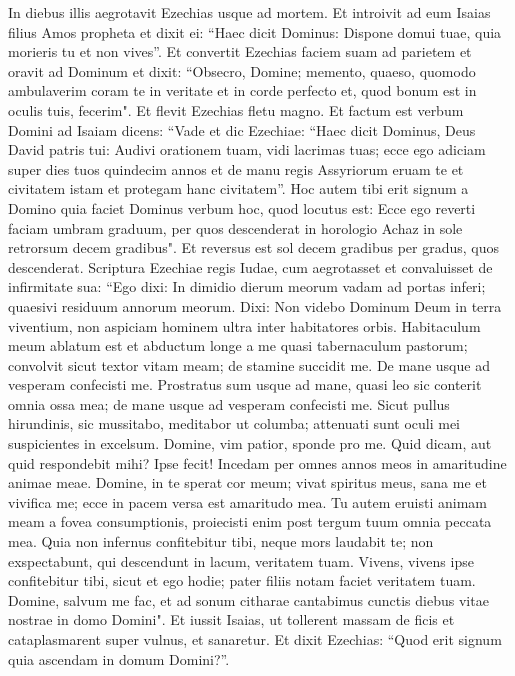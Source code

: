 \begin{biblechapter}  
\verse In diebus illis aegrotavit Ezechias usque ad mortem. Et introivit ad eum Isaias filius Amos propheta et dixit ei: “Haec dicit Dominus: Dispone domui tuae, quia morieris tu et non vives”. 
\verse Et convertit Ezechias faciem suam ad parietem et oravit ad Dominum 
\verse et dixit: “Obsecro, Domine; memento, quaeso, quomodo ambulaverim coram te in veritate et in corde perfecto et, quod bonum est in oculis tuis, fecerim". Et flevit Ezechias fletu magno. 
\verse Et factum est verbum Domini ad Isaiam dicens: 
\verse “Vade et dic Ezechiae: “Haec dicit Dominus, Deus David patris tui: Audivi orationem tuam, vidi lacrimas tuas; ecce ego adiciam super dies tuos quindecim annos 
\verse et de manu regis Assyriorum eruam te et civitatem istam et protegam hanc civitatem”. 
\verse Hoc autem tibi erit signum a Domino quia faciet Dominus verbum hoc, quod locutus est: 
\verse Ecce ego reverti faciam umbram graduum, per quos descenderat in horologio Achaz in sole retrorsum decem gradibus". Et reversus est sol decem gradibus per gradus, quos descenderat. 
\verse Scriptura Ezechiae regis Iudae, cum aegrotasset et convaluisset de infirmitate sua: 
\verse “Ego dixi: In dimidio dierum meorum vadam ad portas inferi; quaesivi residuum annorum meorum. 
\verse Dixi: Non videbo Dominum Deum in terra viventium, non aspiciam hominem ultra inter habitatores orbis. 
\verse Habitaculum meum ablatum est et abductum longe a me quasi tabernaculum pastorum; convolvit sicut textor vitam meam; de stamine succidit me. De mane usque ad vesperam confecisti me. 
\verse Prostratus sum usque ad mane, quasi leo sic conterit omnia ossa mea; de mane usque ad vesperam confecisti me. 
\verse Sicut pullus hirundinis, sic mussitabo, meditabor ut columba; attenuati sunt oculi mei suspicientes in excelsum. Domine, vim patior, sponde pro me. 
\verse Quid dicam, aut quid respondebit mihi? Ipse fecit! Incedam per omnes annos meos in amaritudine animae meae. 
\verse Domine, in te sperat cor meum; vivat spiritus meus, sana me et vivifica me; 
\verse ecce in pacem versa est amaritudo mea. Tu autem eruisti animam meam a fovea consumptionis, proiecisti enim post tergum tuum omnia peccata mea. 
\verse Quia non infernus confitebitur tibi, neque mors laudabit te; non exspectabunt, qui descendunt in lacum, veritatem tuam. 
\verse Vivens, vivens ipse confitebitur tibi, sicut et ego hodie; pater filiis notam faciet veritatem tuam. 
\verse Domine, salvum me fac, et ad sonum citharae cantabimus cunctis diebus vitae nostrae in domo Domini". 
\verse Et iussit Isaias, ut tollerent massam de ficis et cataplasmarent super vulnus, et sanaretur. 
\verse Et dixit Ezechias: “Quod erit signum quia ascendam in domum Domini?”. 
\end{biblechapter}

